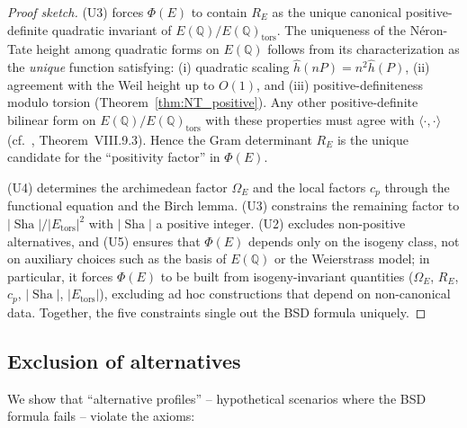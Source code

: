 \documentclass[aps,prd,twocolumn,superscriptaddress,nofootinbib]{revtex4-2}
\theoremstyle{definition}
\theoremstyle{remark}
\DeclareMathOperator{\Sha}{Sha}
\begin{document}
\begin{proof}[Proof sketch]
(U3) forces $\Phi(E)$ to contain $R_E$ as the unique canonical positive-definite quadratic invariant of $E(\mathbb{Q})/E(\mathbb{Q})_{\mathrm{tors}}$. The uniqueness of the N\'eron-Tate height among quadratic forms on $E(\mathbb{Q})$ follows from its characterization as the \textit{unique} function satisfying: (i) quadratic scaling $\hat{h}(nP) = n^2 \hat{h}(P)$, (ii) agreement with the Weil height up to $O(1)$, and (iii) positive-definiteness modulo torsion (Theorem~\ref{thm:NT_positive}). Any other positive-definite bilinear form on $E(\mathbb{Q})/E(\mathbb{Q})_{\mathrm{tors}}$ with these properties must agree with $\langle\cdot,\cdot\rangle$ (cf.\ \cite{Silverman2009}, Theorem~VIII.9.3). Hence the Gram determinant $R_E$ is the unique candidate for the ``positivity factor'' in $\Phi(E)$.

(U4) determines the archimedean factor $\Omega_E$ and the local factors $c_p$ through the functional equation and the Birch lemma. (U3) constrains the remaining factor to $|\Sha|/|E_{\mathrm{tors}}|^2$ with $|\Sha|$ a positive integer. (U2) excludes non-positive alternatives, and (U5) ensures that $\Phi(E)$ depends only on the isogeny class, not on auxiliary choices such as the basis of $E(\mathbb{Q})$ or the Weierstrass model; in particular, it forces $\Phi(E)$ to be built from isogeny-invariant quantities ($\Omega_E$, $R_E$, $c_p$, $|\Sha|$, $|E_{\mathrm{tors}}|$), excluding ad hoc constructions that depend on non-canonical data. Together, the five constraints single out the BSD formula uniquely.
\end{proof}

\subsection{Exclusion of alternatives}

We show that ``alternative profiles'' -- hypothetical scenarios where the BSD formula fails -- violate the axioms:
\end{document}
